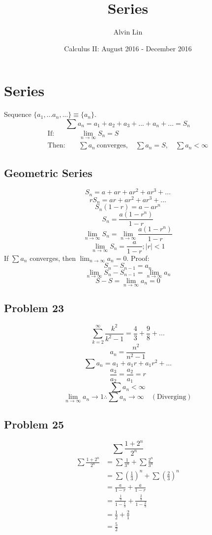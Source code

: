 \documentclass[letterpaper, 12pt]{article}
\title{Series}
\author{Alvin Lin}
\date{Calculus II: August 2016 - December 2016}
\begin{document}
\maketitle

\section*{Series}
Sequence \( \bigg\{a_{1},...a_{n},...\bigg\} \equiv \bigg\{a_{n}\bigg\} \).
\[ \sum{a_{n}} = a_{1}+a_{2}+a_{3}+...+a_{n}+... = S_{n} \]
\begin{align*}
  \mathrm{If:} & \quad \lim_{n\to\infty}{S_{n}} = S \\
  \mathrm{Then:} & \quad \sum{a_{n}} \mathrm{\ converges},
    \quad \sum{a_{n}} = S, \quad \sum{a_{n}}<\infty
\end{align*}

\subsection*{Geometric Series}
\[ S_{n} = a+ar+ar^{2}+ar^{3}+... \]
\[ rS_{n} = ar+ar^{2}+ar^{3}+... \]
\[ S_{n}(1-r) = a-ar^{n} \]
\[ S_{n} = \frac{a(1-r^{n})}{1-r} \]
\[ \lim_{n\to\infty}{S_{n}} = \lim_{n\to\infty}{\frac{a(1-r^{n})}{1-r}} \]
\[ \lim_{n\to\infty}{S_{n}} = \frac{a}{1-r}; |r| < 1 \]
If \( \sum{a_{n}} \) converges, then \( \lim_{n\to\infty}{a_{n}} = 0 \). Proof:
\[ S_{n}-S_{n-1} = a_{n} \]
\[ \lim_{n\to\infty}{S_{n}-S_{n-1}} = \lim_{n\to\infty}{a_{n}} \]
\[ S-S = \lim_{n\to\infty}{a_{n}} = 0 \]

\subsection*{Problem 23}
\[ \sum_{k=2}^{\infty}\frac{k^{2}}{k^{2}-1} = \frac{4}{3}+\frac{9}{8}+...\]
\[ a_{n} = \frac{n^{2}}{n^{2}-1} \]
\[ \sum{a_{n}} = a_{1}+a_{1}r+a_{1}r^{2}+... \]
\[ \frac{a_{3}}{a_{2}} = \frac{a_{2}}{a_{1}} = r \]
\[ \sum{a_{n}} < \infty \]
\[ \lim_{n\to\infty}a_{n}\to1 \therefore \sum{a_{n}}\to\infty \quad
   \mathrm{(Diverging)} \]

\subsection*{Problem 25}
\[ \sum\frac{1+2^{n}}{2^{n}} \]
\begin{align*}
  \sum\frac{1+2^{n}}{2^{n}} &= \sum\frac{1}{3^{n}}+\sum\frac{2^{n}}{3^{n}} \\
  &= \sum(\frac{1}{3})^{n}+\sum(\frac{2}{3})^{n} \\
  &= \frac{a}{1-r}+\frac{a}{1-r} \\
  &= \frac{\frac{1}{3}}{1-\frac{1}{3}}+\frac{\frac{2}{3}}{1-\frac{2}{3}} \\
  &= \frac{1}{2}+\frac{2}{1} \\
  &= \frac{5}{2}
\end{align*}
\end{document}
